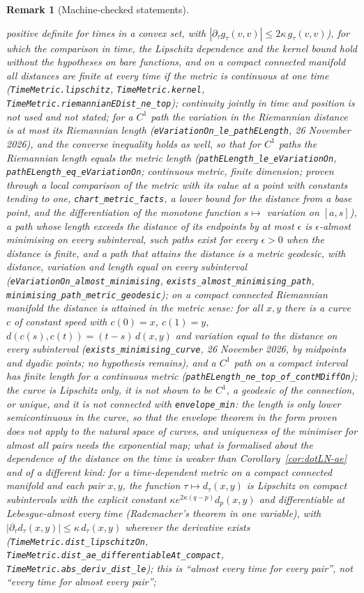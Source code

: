 \documentclass[11pt,a4paper]{article}
\theoremstyle{stmt}
\theoremstyle{defn}
\theoremstyle{rmk}
\newtheorem{remark}[theorem]{Remark}
\numberwithin{equation}{section}
\begin{document}
{\begin{remark}[Machine-checked statements]
\begin{itemize}
positive definite for times in a convex set, with $|\partial_\tau g_\tau(v,v)|\le2\kappa\,g_\tau(v,v)$), for which the comparison in time, the Lipschitz dependence and the kernel bound hold without the hypotheses on bare functions, and on a compact connected manifold all distances are finite at every time if the metric is continuous at one time (\texttt{TimeMetric.lipschitz}, \texttt{TimeMetric.kernel}, \texttt{TimeMetric.riemannianEDist\_ne\_top}); continuity jointly in time and position is not used and not stated; for a $C^1$ path the variation in the Riemannian distance is at most its Riemannian length (\texttt{eVariationOn\_le\_pathELength}, 26 November 2026), and the converse inequality holds as well, so that for $C^1$ paths the Riemannian length equals the metric length (\texttt{pathELength\_le\_eVariationOn}, \texttt{pathELength\_eq\_eVariationOn}; continuous metric, finite dimension; proven through a local comparison of the metric with its value at a point with constants tending to one, \texttt{chart\_metric\_facts}, a lower bound for the distance from a base point, and the differentiation of the monotone function $s\mapsto$ variation on $[a,s]$), a path whose length exceeds the distance of its endpoints by at most $\epsilon$ is $\epsilon$-almost minimising on every subinterval, such paths exist for every $\epsilon>0$ when the distance is finite, and a path that attains the distance is a metric geodesic, with distance, variation and length equal on every subinterval (\texttt{eVariationOn\_almost\_minimising}, \texttt{exists\_almost\_minimising\_path}, \texttt{minimising\_path\_metric\_geodesic}); on a compact connected Riemannian manifold the distance is attained in the metric sense: for all $x,y$ there is a curve $c$ of constant speed with $c(0)=x$, $c(1)=y$, $d(c(s),c(t))=(t-s)\,d(x,y)$ and variation equal to the distance on every subinterval (\texttt{exists\_minimising\_curve}, 26 November 2026, by midpoints and dyadic points; no hypothesis remains), and a $C^1$ path on a compact interval has finite length for a continuous metric (\texttt{pathELength\_ne\_top\_of\_contMDiffOn}); the curve is Lipschitz only, it is not shown to be $C^1$, a geodesic of the connection, or unique, and it is not connected with \texttt{envelope\_min}: the length is only lower semicontinuous in the curve, so that the envelope theorem in the form proven does not apply to the natural space of curves, and uniqueness of the minimiser for almost all pairs needs the exponential map; what is formalised about the dependence of the distance on the time is weaker than Corollary~\ref{cor:dotLN-ae} and of a different kind: for a time-dependent metric on a compact connected manifold and \emph{each} pair $x,y$, the function $\tau\mapsto d_\tau(x,y)$ is Lipschitz on compact subintervals with the explicit constant $\kappa e^{2\kappa(q-p)}d_p(x,y)$ and differentiable at Lebesgue-almost every time (Rademacher's theorem in one variable), with $|\partial_\tau d_\tau(x,y)|\le\kappa\,d_\tau(x,y)$ wherever the derivative exists (\texttt{TimeMetric.dist\_lipschitzOn}, \texttt{TimeMetric.dist\_ae\_differentiableAt\_compact}, \texttt{TimeMetric.abs\_deriv\_dist\_le}); this is ``almost every time for every pair'', not ``every time for almost every pair''; 
\end{itemize}
\end{remark}}
\end{document}
